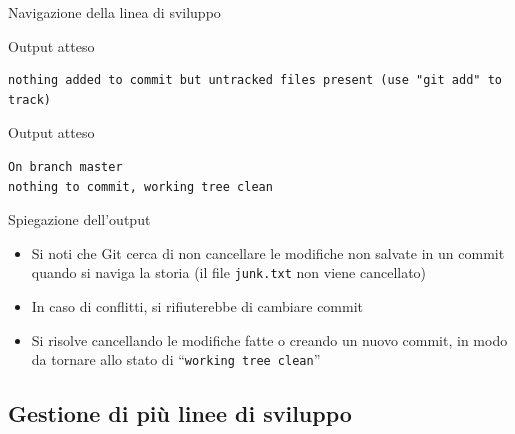 \documentclass[xcolor=dvipsnames,presentation]{beamer}
\begin{document}
\begin{frame}{Navigazione della linea di sviluppo}
\begin{block}{Output atteso}
\begin{Verbatim}[fontsize=\scriptsize]
nothing added to commit but untracked files present (use "git add" to track)
		\end{Verbatim}
	\end{block}
	\begin{block}{Output atteso}
		\begin{Verbatim}[fontsize=\scriptsize]
On branch master
nothing to commit, working tree clean
		\end{Verbatim}
	\end{block}
	\begin{block}{Spiegazione dell'output}
		\begin{itemize}
			\item Si noti che Git cerca di non cancellare le modifiche non salvate in un commit quando si naviga la storia (il file \texttt{junk.txt} non viene cancellato)
			\item In caso di conflitti, si rifiuterebbe di cambiare commit
			\item Si risolve cancellando le modifiche fatte o creando un nuovo commit, in modo da tornare allo stato di ``\texttt{working tree clean}''
		\end{itemize}
	\end{block}
\end{frame}

\subsection{Gestione di più linee di sviluppo}
\end{document}
